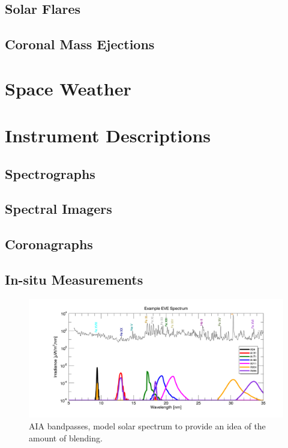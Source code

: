 \subsection{Solar Flares}

\subsection{Coronal Mass Ejections}

\section{Space Weather}

\section{Instrument Descriptions}

\subsection{Spectrographs}

\subsection{Spectral Imagers}

\subsection{Coronagraphs}

\subsection{In-situ Measurements}



\begin{figure}[!h]
    \begin{center}
	    \includegraphics[width=166mm]{Images/AiaBandpasses.png}
    \end{center}
    \caption[AIA bandpasses]{
	    AIA bandpasses, model solar spectrum to provide an idea of the amount of blending. 
	}
    \label{aiabandpasses}
\end{figure}